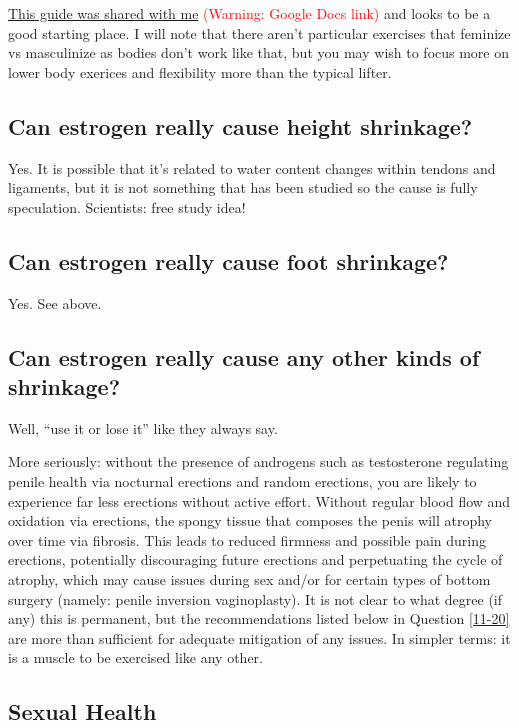 \documentclass{article}
\begin{document}
\href{https://docs.google.com/document/d/1-NyE5EY5TTaRRMhk7HlTbKJ7HifjEsA4jlDO1qKQVl0/edit?tab=t.0}{This guide was shared with me} \textcolor{red}{(Warning: Google Docs link)} and looks to be a good starting place. I will note that there aren't particular exercises that feminize vs masculinize as bodies don't work like that, but you may wish to focus more on lower body exerices and flexibility more than the typical lifter.

\subsection{Can estrogen really cause height shrinkage?}

Yes. It is possible that it’s related to water content changes within tendons and ligaments, but it is not something that has been studied so the cause is fully speculation. Scientists: free study idea!

\subsection{Can estrogen really cause foot shrinkage?}

Yes. See above.

\subsection{Can estrogen really cause any other kinds of shrinkage?}\label{11-19}

Well, “use it or lose it” like they always say.

More seriously: without the presence of androgens such as testosterone regulating penile health via nocturnal erections and random erections, you are likely to experience far less erections without active effort. Without regular blood flow and oxidation via erections, the spongy tissue that composes the penis will atrophy over time via fibrosis. This leads to reduced firmness and possible pain during erections, potentially discouraging future erections and perpetuating the cycle of atrophy, which may cause issues during sex and/or for certain types of bottom surgery (namely: penile inversion vaginoplasty). It is not clear to what degree (if any) this is permanent, but the recommendations listed below in Question \ref{11-20} are more than sufficient for adequate mitigation of any issues. In simpler terms: it is a muscle to be exercised like any other.

\subsection*{Sexual Health}
\end{document}

